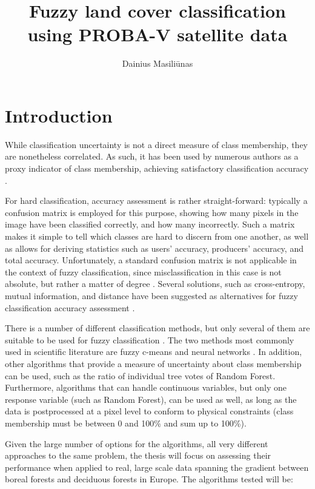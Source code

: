 \documentclass[a4paper,10pt]{article}
\title{Fuzzy land cover classification using PROBA-V satellite data}
\author{Dainius Masili\=unas}
\begin{document}
\maketitle

\begin{abstract}

\end{abstract}

\section{Introduction}

While classification uncertainty is not a direct measure of class membership, they are nonetheless correlated. As such, it has been used by numerous authors as a proxy indicator of class membership, achieving satisfactory classification accuracy \cite{foody2002accuracy}.

For hard classification, accuracy assessment is rather straight-forward: typically a confusion matrix is employed for this purpose, showing how many pixels in the image have been classified correctly, and how many incorrectly. Such a matrix makes it simple to tell which classes are hard to discern from one another, as well as allows for deriving statistics such as users' accuracy, producers' accuracy, and total accuracy. Unfortunately, a standard confusion matrix is not applicable in the context of fuzzy classification, since misclassification in this case is not absolute, but rather a matter of degree \cite{foody2002accuracy}. Several solutions, such as cross-entropy, mutual information, and distance have been suggested as alternatives for fuzzy classification accuracy assessment \cite{lu2007methods}.

There is a number of different classification methods, but only several of them are suitable to be used for fuzzy classification \cite{nath2014methods}. The two methods most commonly used in scientific literature are fuzzy c-means and neural networks \cite{zhang2001fullyfuzzy}. In addition, other algorithms that provide a measure of uncertainty about class membership can be used, such as the ratio of individual tree votes of Random Forest. Furthermore, algorithms that can handle continuous variables, but only one response variable (such as Random Forest), can be used as well, as long as the data is postprocessed at a pixel level to conform to physical constraints (class membership must be between 0 and 100\% and sum up to 100\%).

Given the large number of options for the algorithms, all very different approaches to the same problem, the thesis will focus on assessing their performance when applied to real, large scale data spanning the gradient between boreal forests and deciduous forests in Europe. The algorithms tested will be:
\end{document}
